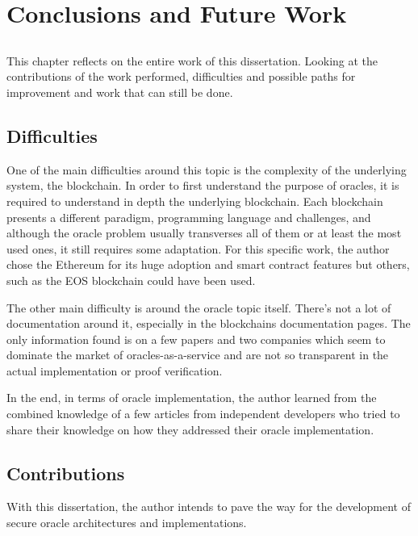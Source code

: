\chapter{Conclusions and Future Work} \label{chap:concl}

\section*{}

This chapter reflects on the entire work of this dissertation. Looking at the contributions of the work performed, difficulties and possible paths for improvement and work that can still be done.

\section{Difficulties}
One of the main difficulties around this topic is the complexity of the underlying system, the blockchain. In order to first understand the purpose of oracles, it is required to understand in depth the underlying blockchain. Each blockchain presents a different paradigm, programming language and challenges, and although the oracle problem usually transverses all of them or at least the most used ones, it still requires some adaptation. For this specific work, the author chose the Ethereum for its huge adoption and smart contract features but others, such as the EOS blockchain could have been used.

The other main difficulty is around the oracle topic itself. There's not a lot of documentation around it, especially in the blockchains documentation pages. The only information found is on a few papers and two companies which seem to dominate the market of oracles-as-a-service and are not so transparent in the actual implementation or proof verification.

In the end, in terms of oracle implementation, the author learned from the combined knowledge of a few articles from independent developers who tried to share their knowledge on how they addressed their oracle implementation.



\section{Contributions}
With this dissertation, the author intends to pave the way for the development of secure oracle architectures and implementations.

